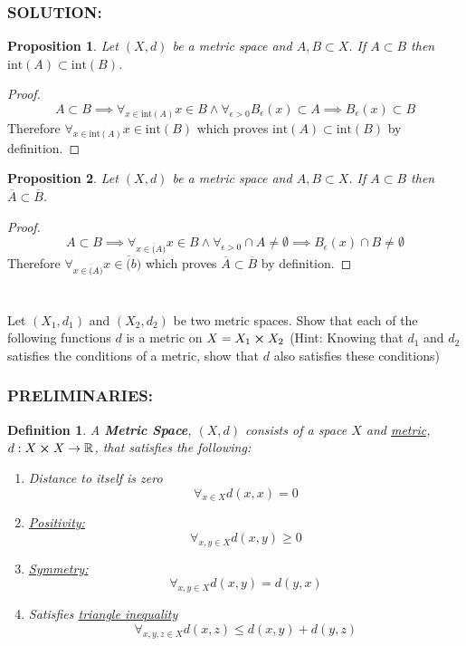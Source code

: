 \documentclass[]{article}
\newcommand{\Solution}{\subsubsection*{\textbf{SOLUTION:}}}
\newcommand{\Preliminaries}{\subsubsection*{\textbf{PRELIMINARIES:}}}
\newcommand{\R}{\mathbb{R}}
\newtheorem{definition}{Definition}
\newtheorem{proposition}{Proposition}
\begin{document}
\Solution

\begin{proposition}
    Let $(X,d)$ be a metric space and $A, B \subset X$.
    If $A \subset B$ then $\text{int}(A) \subset \text{int}(B)$.
\end{proposition}
\begin{proof}
    \[
        A \subset B \implies \forall_{x \in \text{int}(A)} x \in B \land \forall_{\epsilon>0} B_{\epsilon}(x) \subset A \implies B_{\epsilon}(x) \subset B
    \] Therefore $\forall_{x \in \text{int}(A)} x \in \text{int}(B)$ which proves $\text{int}(A) \subset \text{int}(B)$ by definition.
\end{proof}

\begin{proposition}
    Let $(X,d)$ be a metric space and $A, B \subset X$.
    If $A \subset B$ then $\overline{A} \subset \overline{B}$.
\end{proposition}
\begin{proof}
    \[
        A \subset B \implies \forall_{x \in \overline(A)} x \in B \land \forall_{\epsilon>0} \cap A \neq \emptyset \implies B_{\epsilon}(x) \cap B \neq \emptyset
    \] Therefore $\forall_{x \in \overline(A)} x \in \overline(b)$ which proves $\overline{A} \subset \overline{B}$ by definition.
\end{proof}


\newpage
\section{}
Let $(X_1, d_1)$ and $(X_2, d_2)$ be two metric spaces.
Show that each of the following functions $d$ is a metric on $X = X_1 \cross X_2$
(Hint: Knowing that $d_1$ and $d_2$ satisfies the conditions of a metric, show that $d$ also satisfies these conditions)

\Preliminaries
\begin{definition}
    A \emph{\textbf{Metric Space}}, $(X,d)$ consists of a space $X$ and \emph{\underline{metric}}, $d : X \cross X \to \R$, that satisfies the following:
    \begin{enumerate}
        \item Distance to itself is zero \[
            \forall_{x \in X} d(x,x) = 0
        \] \item \emph{\underline{Positivity:}} \[
            \forall_{x,y \in X} d(x,y) \geq 0
        \] \item \emph{\underline{Symmetry:}} \[
            \forall_{x,y \in X} d(x,y) = d(y,x)
        \] \item Satisfies \emph{\underline{triangle inequality}} \[
            \forall_{x,y,z \in X} d(x,z) \leq d(x,y) + d(y,z)
        \]
    \end{enumerate}
\end{definition}
\end{document}
